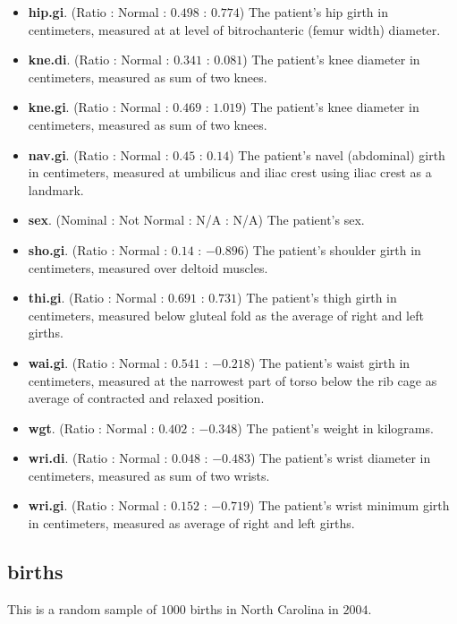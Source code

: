 \begin{itemize}
  \item \textbf{hip.gi}. (Ratio : Normal : $ 0.498 $ : $ 0.774 $) The patient's hip girth in centimeters, measured at at level of bitrochanteric (femur width) diameter.
  \item \textbf{kne.di}. (Ratio : Normal : $ 0.341 $ : $ 0.081 $) The patient's knee diameter in centimeters, measured as sum of two knees.
  \item \textbf{kne.gi}. (Ratio : Normal : $ 0.469 $ : $ 1.019 $) The patient's knee diameter in centimeters, measured as sum of two knees.
  \item \textbf{nav.gi}. (Ratio : Normal : $ 0.45 $ : $ 0.14 $) The patient's navel (abdominal) girth in centimeters, measured at umbilicus and iliac crest using iliac crest as a landmark.
  \item \textbf{sex}. (Nominal : Not Normal : N/A : N/A) The patient's sex.
  \item \textbf{sho.gi}. (Ratio : Normal : $ 0.14 $ : $ -0.896 $) The patient's shoulder girth in centimeters, measured over deltoid muscles.
  \item \textbf{thi.gi}. (Ratio : Normal : $ 0.691 $ : $ 0.731 $) The patient's thigh girth in centimeters, measured below gluteal fold as the average of right and left girths.
  \item \textbf{wai.gi}. (Ratio : Normal : $ 0.541 $ : $ -0.218 $) The patient's waist girth in centimeters, measured at the narrowest part of torso below the rib cage as average of contracted and relaxed position.  
  \item \textbf{wgt}. (Ratio : Normal : $ 0.402 $ : $ -0.348 $) The patient's weight in kilograms.
  \item \textbf{wri.di}. (Ratio : Normal : $ 0.048 $ : $ -0.483 $) The patient's wrist diameter in centimeters, measured as sum of two wrists.
  \item \textbf{wri.gi}. (Ratio : Normal : $ 0.152 $ : $ -0.719 $) The patient's wrist minimum girth in centimeters, measured as average of right and left girths.  
\end{itemize}

\subsection{births}

This is a random sample of $ 1000 $ births in North Carolina in $ 2004 $.

